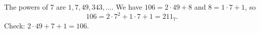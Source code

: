 The powers of $7$ are $1,7,49,343,\dots$. We have $106=2\cdot49+8$ and $8=1\cdot7+1$, so
\[
106=2\cdot7^2+1\cdot7+1=\boxed{211_7}.
\]
Check: $2\cdot49+7+1=106$.
